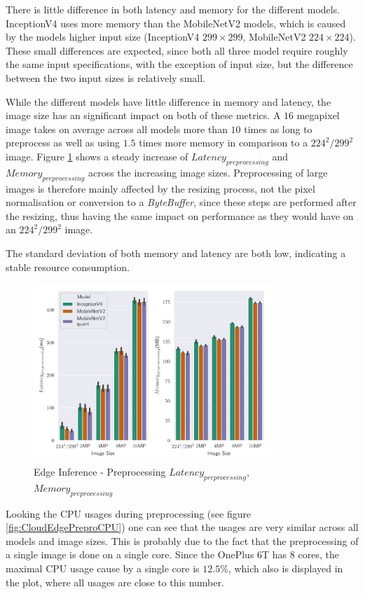 There is little difference in both latency and memory for the different models. 
InceptionV4 uses more memory than the MobileNetV2 models, which is caused by the models higher input size (InceptionV4 $299\times299$, MobileNetV2 $224\times224$). 
These small differences are expected, since both all three model require roughly the same input specifications, with the exception of input size, but the difference between the two input sizes is relatively small.

While the different models have little difference in memory and latency, the image size has an significant impact on both of these metrics.
A $16$ megapixel image takes on average across all models more than $10$ times as long to preprocess as well as using $1.5$ times more memory in comparison to a $224^2/299^2$ image.
Figure \ref{fig:EdgePrepro} shows a steady increase of $Latency_{preprocessing}$ and $Memory_{preprocessing}$ across the increasing image sizes.
Preprocessing of large images is therefore mainly affected by the resizing process, not the pixel normalisation or conversion to a \emph{ByteBuffer}, since these steps are performed after the resizing, thus having the same impact on performance as they would have on an $224^2/299^2$ image.

The standard deviation of both memory and latency are both low, indicating a stable resource consumption.



\begin{figure}[H]
\centering
\includegraphics[width=0.8\textwidth]{./Bilder/single_plots/edge_inference_plots/Edge_Inference_Preprocessing.pdf}
\caption{Edge Inference - Preprocessing $Latency_{preprocessing}$, $Memory_{preprocessing}$}
\label{fig:EdgePrepro}
\end{figure}
Looking the CPU usages during preprocessing (see figure \ref{fig:CloudEdgePreproCPU}) one can see that the usages are very similar across all models and image sizes. This is probably due to the fact that the preprocessing of a single image is done on a single core. Since the OnePlus 6T has $8$ cores, the maximal CPU usage cause by a single core is $12.5\%$, which also is displayed in the plot, where all usages are close to this number.


